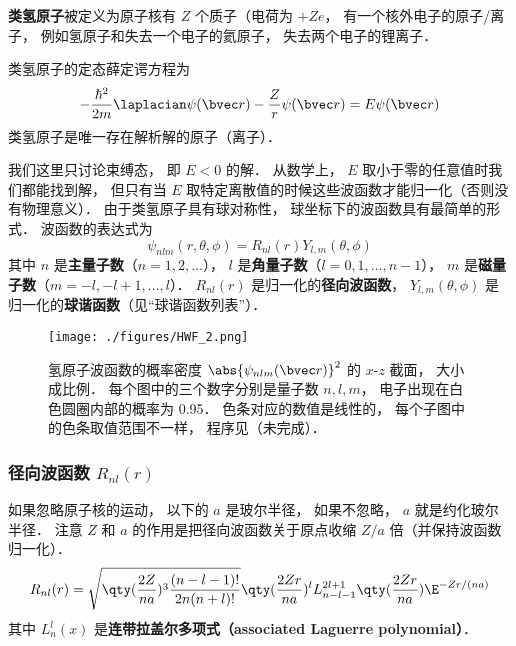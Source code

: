 

\textbf{类氢原子}被定义为原子核有 $Z$ 个质子（电荷为 $+Ze$， 有一个核外电子的原子/离子， 例如氢原子和失去一个电子的氦原子， 失去两个电子的锂离子． %

类氢原子的定态薛定谔方程为
\begin{equation}\label{HWF_eq1}
-\frac{\hbar^2}{2m} \laplacian \psi(\bvec r) - \frac{Z}{r} \psi(\bvec r) = E \psi(\bvec r)
\end{equation}
类氢原子是唯一存在解析解的原子（离子）．

我们这里只讨论束缚态， 即 $E < 0$ 的解．  从数学上， $E$ 取小于零的任意值时我们都能找到解， 但只有当 $E$ 取特定离散值的时候这些波函数才能归一化（否则没有物理意义）． 由于类氢原子具有球对称性， 球坐标下的波函数具有最简单的形式． 波函数的表达式为
\begin{equation}\label{HWF_eq3}
\psi_{nlm} (r,\theta ,\phi) = R_{nl}(r) Y_{l,m}(\theta, \phi)
\end{equation}
其中 $n$ 是\textbf{主量子数}（$n = 1, 2, \dots$）， $l$ 是\textbf{角量子数}（$l = 0, 1, \dots, n - 1$）， $m$ 是\textbf{磁量子数}（$m = -l, -l+1, \dots, l$）． $R_{nl}(r)$ 是归一化的\textbf{径向波函数}， $Y_{l,m}(\theta, \phi)$ 是归一化的\textbf{球谐函数}（见“球谐函数列表”）．

\begin{figure}[ht]
\centering
\texttt{[image: ./figures/HWF\_2.png]}
\caption{氢原子波函数的概率密度 $\abs{\psi_{nlm}(\bvec r)}^2$ 的 $x$-$z$ 截面， 大小成比例． 每个图中的三个数字分别是量子数 $n, l, m$， 电子出现在白色圆圈内部的概率为 0.95． 色条对应的数值是线性的， 每个子图中的色条取值范围不一样， 程序见（未完成）．} \label{HWF_fig2}
\end{figure}

\subsubsection{径向波函数 $R_{nl}(r)$}

如果忽略原子核的运动， 以下的 $a$ 是玻尔半径， 如果不忽略， $a$ 就是约化玻尔半径．%
注意 $Z$ 和 $a$ 的作用是把径向波函数关于原点收缩 $Z/a$ 倍（并保持波函数归一化）．
\begin{equation}\label{HWF_eq2}
R_{nl}(r) = \sqrt{\qty(\frac{2 Z}{na})^3 \frac{(n - l - 1)!}{2n (n + l)!}} \qty(\frac{2Zr}{na})^l  L_{n-l-1}^{2l+1}\qty(\frac{2Zr}{na}) \E^{-Zr/(na)}
\end{equation}
其中 $L_n^l(x)$ 是\textbf{连带拉盖尔多项式（associated Laguerre polynomial）}．

